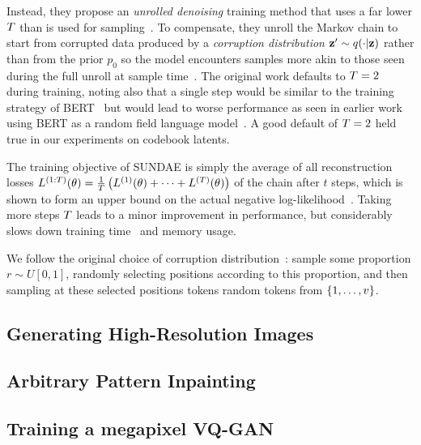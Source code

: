 Instead, they propose an \textit{unrolled denoising} training method that uses a
far lower $T$ than is used for
sampling~\cite{savinov2022stepunrolled}. To compensate, they unroll the Markov
chain to start from corrupted data produced by a \textit{corruption
distribution} $\mathbf{z}' \sim q(\cdot \vert \mathbf{z})$ rather than from the prior $p_0$ so the model
encounters samples more akin to those seen during the full unroll at sample
time~\cite{savinov2022stepunrolled}. The original work defaults to $T
= 2$ during training, noting also that a single step would be similar to the
training strategy of BERT~\cite{devlin2019bert} but would lead to worse
performance as seen in earlier work using BERT as a random field language
model~\cite{wang2019bert}. A good default of $T = 2$ held true in our
experiments on codebook latents.

The training objective of SUNDAE is simply the average of all reconstruction
losses $L^{(1:T)}(\theta) = \frac{1}{T} \left(L^{(1)}(\theta) + \dots +
L^{(T)}(\theta) \right)$ of the chain after $t$ steps, which is shown to form
an upper bound on the actual negative
log-likelihood~\cite{savinov2022stepunrolled}. Taking more steps $T$
leads to a minor improvement in performance, but considerably slows down
training time~\cite{savinov2022stepunrolled} and memory usage.

We follow the original choice of corruption
distribution~\cite{savinov2022stepunrolled}: sample some
proportion $r \sim U[0, 1]$, randomly selecting positions according to this
proportion, and then sampling at these selected positions tokens random tokens
from $\{1, \dots, v\}$.


\subsection{Generating High-Resolution Images}


\subsection{Arbitrary Pattern Inpainting}

\subsection{Training a megapixel VQ-GAN}

\label{sec:megagan}
